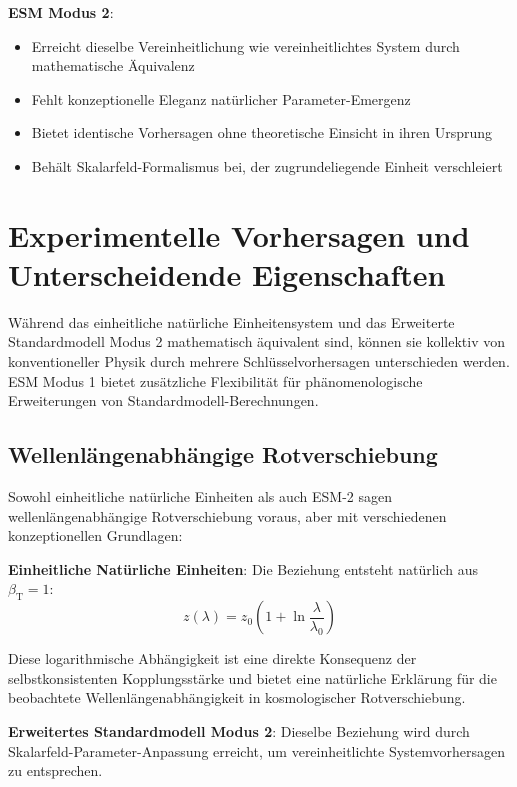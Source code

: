 \documentclass[12pt,a4paper]{article}
\newcommand{\betaT}{\beta_{\text{T}}}
\begin{document}
	\textbf{ESM Modus 2}:
	\begin{itemize}
		\item Erreicht dieselbe Vereinheitlichung wie vereinheitlichtes System durch mathematische Äquivalenz
		\item Fehlt konzeptionelle Eleganz natürlicher Parameter-Emergenz
		\item Bietet identische Vorhersagen ohne theoretische Einsicht in ihren Ursprung
		\item Behält Skalarfeld-Formalismus bei, der zugrundeliegende Einheit verschleiert
	\end{itemize}
	
	\section{Experimentelle Vorhersagen und Unterscheidende Eigenschaften}
	\label{sec:experimental_predictions}
	
	Während das einheitliche natürliche Einheitensystem und das Erweiterte Standardmodell Modus 2 mathematisch äquivalent sind, können sie kollektiv von konventioneller Physik durch mehrere Schlüsselvorhersagen unterschieden werden. ESM Modus 1 bietet zusätzliche Flexibilität für phänomenologische Erweiterungen von Standardmodell-Berechnungen.
	
	\subsection{Wellenlängenabhängige Rotverschiebung}
	\label{subsec:wavelength_dependent_redshift}
	
	Sowohl einheitliche natürliche Einheiten als auch ESM-2 sagen wellenlängenabhängige Rotverschiebung voraus, aber mit verschiedenen konzeptionellen Grundlagen:
	
	\textbf{Einheitliche Natürliche Einheiten}: Die Beziehung entsteht natürlich aus $\betaT = 1$:
	\begin{equation}
		z(\lambda) = z_0\left(1 + \ln\frac{\lambda}{\lambda_0}\right)
	\end{equation}
	
	Diese logarithmische Abhängigkeit ist eine direkte Konsequenz der selbstkonsistenten Kopplungsstärke und bietet eine natürliche Erklärung für die beobachtete Wellenlängenabhängigkeit in kosmologischer Rotverschiebung.
	
	\textbf{Erweitertes Standardmodell Modus 2}: Dieselbe Beziehung wird durch Skalarfeld-Parameter-Anpassung erreicht, um vereinheitlichte Systemvorhersagen zu entsprechen.
	
\end{document}
